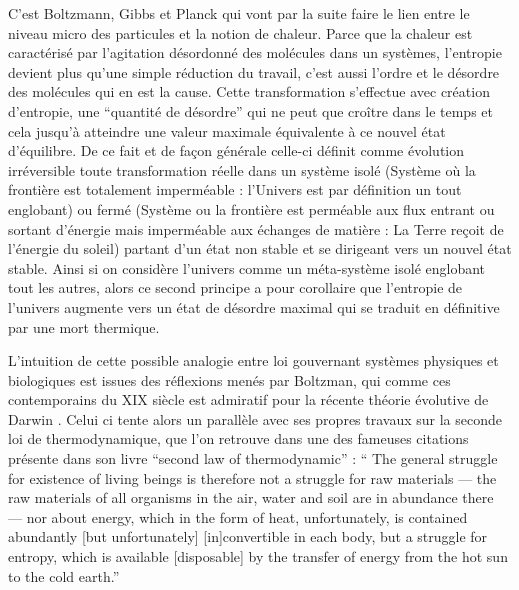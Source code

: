 C'est Boltzmann, Gibbs et Planck qui vont par la suite faire le lien entre le niveau micro des particules et la notion de chaleur. Parce que la chaleur est caractérisé par l'agitation désordonné des molécules dans un systèmes, l'entropie devient plus qu'une simple réduction du travail, c'est aussi l'ordre et le désordre des molécules qui en est la cause. Cette transformation s'effectue avec création d'entropie, une \enquote{quantité de désordre} qui ne peut que croître dans le temps et cela jusqu'à atteindre une valeur maximale équivalente à ce nouvel état d'équilibre. De ce fait et de façon générale celle-ci définit comme évolution irréversible toute transformation réelle dans un système isolé (Système où la frontière est totalement imperméable : l'Univers est par définition un tout englobant) ou fermé (Système ou la frontière est perméable aux flux entrant ou sortant d'énergie mais imperméable aux échanges de matière : La Terre reçoit de l'énergie du soleil) partant d'un état non stable et se dirigeant vers un nouvel état stable.  Ainsi si on considère l'univers comme un méta-système isolé englobant tout les autres, alors ce second principe a pour corollaire que l'entropie de l'univers augmente vers un état de désordre maximal qui se traduit en définitive par une mort thermique.

L'intuition de cette possible analogie entre loi gouvernant systèmes physiques et biologiques est issues des réflexions menés par Boltzman, qui comme ces contemporains du XIX siècle est admiratif pour la récente théorie évolutive de Darwin \autocite[27]{Prigogine1996}. Celui ci tente alors un parallèle avec ses propres travaux sur la seconde loi de thermodynamique, que l'on retrouve dans une des fameuses citations présente dans son livre \enquote{second law of thermodynamic} : \enquote{ The general struggle for existence of living beings is therefore not a struggle for raw materials — the raw materials of all organisms in the air, water and soil are in abundance there — nor about energy, which in the form of heat, unfortunately, is contained abundantly [but unfortunately] [in]convertible in each body, but a struggle for entropy, which is available [disposable] by the transfer of energy from the hot sun to the cold earth.}

